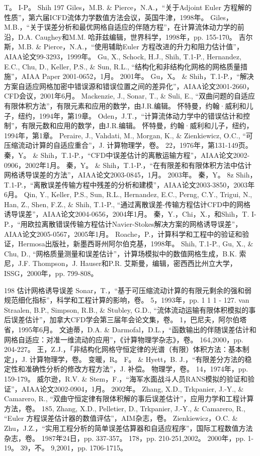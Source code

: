 \documentclass[UTF8,11pt,a4paper,openany,fontset=fandol]{ctexbook}
\begin{document}
T。 I-P。 Shih 197 Giles，M.B. \& Pierce，N.A.，“关于Adjoint Euler 方程解的性质”，第六届ICFD流体力学数值方法会议，英国牛津，1998年。 Giles，M.B.，“关于误差分析和最优网格自适应的伴随方程”，在计算流体动力学的前沿，D.A. Caughey和M.M. 哈菲兹编辑，世界科学，1998年，pp. 155-170。 吉尔斯，M.B. \& Pierce，N.A.，“使用辅助Euler 方程改进的升力和阻力估计值”，AIAA论文99-3293，1999年。 Gu, X., Schock, H.J., Shih, T.1-P., Hernandez, E.C., Chu, D., Keller, P.S., \& Sun, R.L., “结构化和非结构化网格的网格质量措施”，AIAA Paper 2001-0652，1月。 2001年。 Gu，X。 \& Shih，T.1-P.，“解决方案自适应网格加密中错误源和错误位置之间的差异化”，AIAA论文2001-2660，CFD会议，2001年6月。 Mackenzie, J., Sonar, T., \& Suli, E., “双曲问题的自适应有限体积方法”，有限元素和应用的数学，由J.R.编辑。 怀特曼，约翰·威利和儿子，纽约，1994年，第19章。 Oden，J.T.，“计算流体动力学中的错误估计和控制”，有限元数和应用的数学，由J.R.编辑。 怀特曼，约翰·威利和儿子，纽约，1994年，第1章。 Peraire, J., Vahdati, M., Morgan, K., \& Zienkiewicz, O.C., “可压缩流动计算的自适应重合”，J. 计算物理学，卷。 22，1976年，第131-149页。 秦，Y。 \& Shih，T.1-P.，“CFD中误差估计的离散运输方程”，AIAA论文2002-0906，2002年1月。 秦，Y。 \& Shih，T.1-P.，“在有限差和有限体积方法中估计网格诱导误差的方法”，AIAA论文2003-0845，1月。 2003年。 秦，Y。 8z Shih，T.1-P.，“离散误差传输方程中残差的分析和建模”，AIAA论文2003-3850，2003年6月。 Qin, Y., Keller, P.S., Sun, R.L., Hernandez, E.C., Perng, C.Y., Trigui, N., Han, Z., Shen, F.Z., \& Shih, T.1-P., “通过离散误差-传输方程估计CFD中的网格诱导误差”，AIAA论文2004-0656，2004年1月。 秦，Y.，Chi，X.，和Shih，T. I-P.，“用欧拉离散错误传输方程估计Navier-Stokes解决方案的网格诱导误差”，AIAA论文2005-0567，2005年1月。 Roache，P.，计算科学和工程中的验证和验证，Hermosa出版社，新墨西哥州阿尔伯克基，1998年。 Shih, T.1-P., Gu, X., \& Chu, D., “网格质量测量和误差估计”，计算场模拟中的数值网格生成，B.K. 索尼，J.F. Thompson，J. Hauser和P.R. 艾斯曼，编辑，密西西比州立大学，ISSG，2000年，pp. 799-808。

198 估计网格诱导误差 Sonar，T.，“基于可压缩流动计算的有限元剩余的强和弱规范细化指标”，科学和工程计算的影响，卷。 5，1993年，pp. 1 1 1 - 127. van Straalen, B.P., Simpson, R.B., \& Stubley, G.D., “流体流动运输有限体积模拟的事后误差估计”，加拿大CFD学会第三届年会论文集，卷。 1，巴尼夫，阿尔伯塔省，1995年6月。 文迪蒂，D.A. \& Darmofal，D.L.，“函数输出的伴随误差估计和网格自适应：对准一维流动的应用”，《计算物理学杂志》，卷。 164,2000，pp. 204-227。 王，Z.J.，「非结构化网格守恒定律的光谱（有限）体积方法：基本制定」，J. 计算物理学，卷。 变暖，R。 F。 \& Hyett，B. J.，“有限差分方法的稳定性和准确性分析的修改方程方法”，J. 补偿。 物理学，卷。 14，1974年，pp. 159-179。 威尔逊，R.V. \& Stem，F.，“海军水面战斗人员RANS模拟的验证和验证”，AIAA论文2002-0904，1月。 2002年。 Zhang, X.D., Trkpanier, J.-Y., \& Camarero, R., “双曲守恒定律有限体积解的事后误差估计”，应用力学和工程计算方法，卷。 185, Zhang, X.D., Pelletier, D., Trkpanier, J.-Y., \& Camarero, R., “Euler 方程误差估计器的数值评估”，AIM杂志，卷。 Zienkiewicz，O.C. \& Zhu，J.Z.，“实用工程分析的简单误差估算器和自适应程序”，国际工程数值方法杂志，卷。 1987年24日，pp. 337-357。 178，pp. 210-251,2002。 2000年，pp. 1-19。 39，不。 9,2001，pp. 1706-1715。
\end{document}
